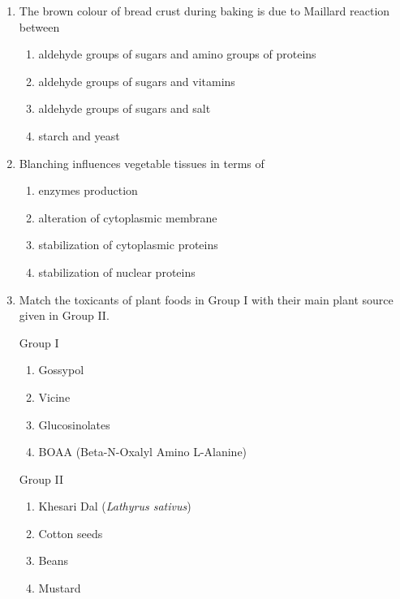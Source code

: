\documentclass[journal,12pt,onecolumn]{IEEEtran}
\theoremstyle{remark}
\begin{document}
\begin{enumerate}
\item The brown colour of bread crust during baking is due to Maillard reaction between
\begin{multicols}{2}
\begin{enumerate}
\item aldehyde groups of sugars and amino groups of proteins
\item aldehyde groups of sugars and vitamins
\item aldehyde groups of sugars and salt
\item starch and yeast
\end{enumerate}
\end{multicols}

\item Blanching influences vegetable tissues in terms of
\begin{multicols}{2}
\begin{enumerate}
\item enzymes production
\item alteration of cytoplasmic membrane
\item stabilization of cytoplasmic proteins
\item stabilization of nuclear proteins
\end{enumerate}
\end{multicols}


\item Match the toxicants of plant foods in Group I with their main plant source given in Group II.

\begin{multicols}{2}
Group I
\begin{enumerate}[label=\Alph*.]
    \item Gossypol
    \item Vicine
    \item Glucosinolates
    \item BOAA (Beta-N-Oxalyl Amino L-Alanine)
\end{enumerate}

Group II
\begin{enumerate}[label=\arabic*.]
    \item Khesari Dal (\textit{Lathyrus sativus})
    \item Cotton seeds
    \item Beans
    \item Mustard
\end{enumerate}
\end{multicols}


\end{enumerate}
\end{document}
